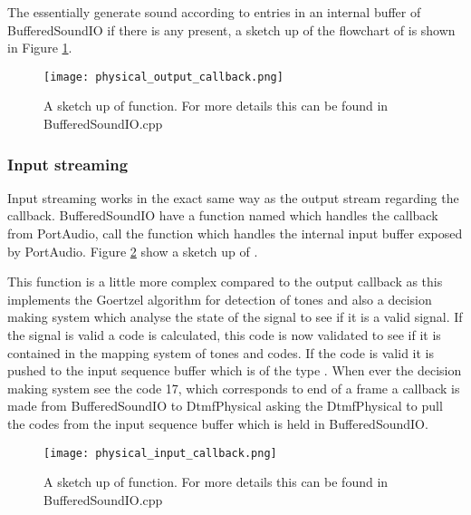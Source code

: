 		The  essentially generate sound according to entries in an internal buffer of BufferedSoundIO
		if there is any present, a sketch up of the flowchart of  is shown in Figure \ref{fig:physical_output_callback}.
		
		\begin{figure}[htb]
			\begin{center}
			\texttt{[image: physical\_output\_callback.png]}%
			\caption{A sketch up of  function. For more details this can be found in BufferedSoundIO.cpp}
			\label{fig:physical_output_callback}
			\end{center}
		\end{figure}
		
		\subsubsection{Input streaming}
		Input streaming works in the exact same way as the output stream regarding the callback. BufferedSoundIO have a function named
		 which handles the callback from PortAudio,  call the 
		function which handles the internal input buffer exposed by PortAudio. Figure \ref{fig:physical_input_callback} show a sketch up of .
		
		This function is a little more complex compared to the output callback as this implements the Goertzel algorithm for detection of tones and also
		a decision making system which analyse the state of the signal to see if it is a valid signal. If the signal is valid a code is calculated, this
		code is now validated to see if it is contained in the mapping system of tones and codes. If the code is valid it is pushed to the input
		sequence buffer which is of the type . When ever the decision making system see the code 17,
		which corresponds to end of a frame a callback is made from BufferedSoundIO to DtmfPhysical asking the DtmfPhysical to pull the codes from
		the input sequence buffer which is held in BufferedSoundIO.
		
		\begin{figure}[htb]
			\begin{center}
			\texttt{[image: physical\_input\_callback.png]}%
			\caption{A sketch up of  function. For more details this can be found in BufferedSoundIO.cpp}
			\label{fig:physical_input_callback}
			\end{center}
		\end{figure}
		
